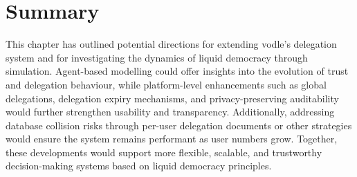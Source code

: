 \section{Summary}

This chapter has outlined potential directions for extending vodle's delegation system and for investigating the dynamics of liquid democracy through simulation. Agent-based modelling could offer insights into the evolution of trust and delegation behaviour, while platform-level enhancements such as global delegations, delegation expiry mechanisms, and privacy-preserving auditability would further strengthen usability and transparency.
Additionally, addressing database collision risks through per-user delegation documents or other strategies would ensure the system remains performant as user numbers grow. Together, these developments would support more flexible, scalable, and trustworthy decision-making systems based on liquid democracy principles.

